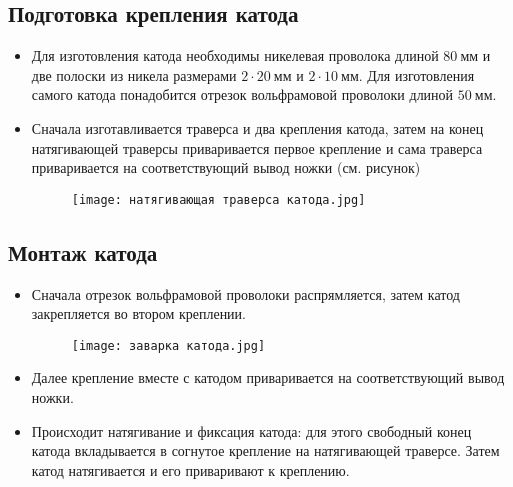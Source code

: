 \documentclass[a4paper]{article}
\begin{document}
\subsection{Подготовка крепления катода}
\begin{itemize}
    \item Для изготовления катода необходимы никелевая проволока длиной $80~\text{мм}$ и две полоски из никела размерами $2 \cdot 20~\text{мм}$ и  $2 \cdot 10~\text{мм}$. Для изготовления самого катода понадобится отрезок вольфрамовой проволоки длиной $50~\text{мм}$.
    \item Сначала изготавливается траверса и два крепления катода, затем на конец натягивающей траверсы приваривается первое крепление и сама траверса приваривается на соответствующий вывод ножки (см. рисунок)
\begin{figure}[h]
\begin{center}
\texttt{[image: натягивающая траверса катода.jpg]}
\end{center}
\end{figure}
\end{itemize}
\subsection{Монтаж катода}
\begin{itemize}
    \item Сначала отрезок вольфрамовой проволоки распрямляется, затем катод закрепляется во втором креплении.
\begin{figure}[h]
\begin{center}
\texttt{[image: заварка катода.jpg]}
\end{center}
\end{figure}
    \item Далее крепление вместе с катодом приваривается на соответствующий вывод ножки.
    \item Происходит натягивание и фиксация катода: для этого свободный конец катода вкладывается в согнутое крепление на натягивающей траверсе. Затем катод натягивается и его приваривают к креплению.
\end{itemize}

\newpage
\end{document}
